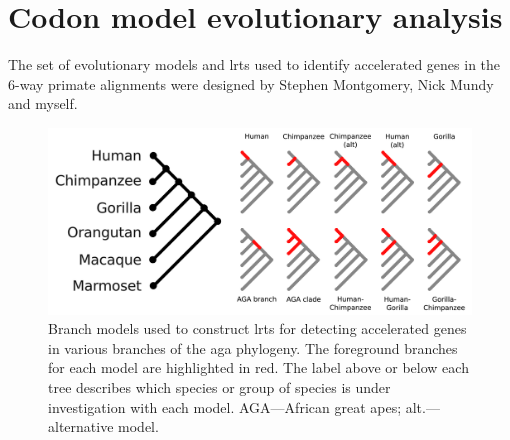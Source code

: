 \section{Codon model evolutionary analysis}

The set of evolutionary models and \acp{lrt} used to identify
accelerated genes in the 6-way primate alignments were designed by
Stephen Montgomery, Nick Mundy and myself.

\begin{figure}
\centering
\includegraphics[scale=0.5]{Figs/gorilla_branch_models.pdf}
\caption{Branch models used to construct \acp{lrt} for detecting
  accelerated genes in various branches of the \ac{aga} phylogeny. The
  foreground branches for each model are highlighted in red. The label
  above or below each tree describes which species or group of species
  is under investigation with each model. AGA---African great apes;
  alt.---alternative model.}
\label{fig_gorilla_branch_models}
\end{figure}

